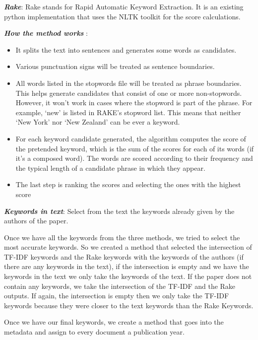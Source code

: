 \documentclass[article,twocolumn]{IEEEtran}
\providecommand{\tightlist}{%
      \setlength{\itemsep}{0pt}\setlength{\parskip}{0pt}}
\begin{document}
    \textbf{\emph{Rake}}: Rake stands for Rapid Automatic Keyword
Extraction. It is an existing python implementation that uses the NLTK
toolkit for the score calculations.

\textbf{\emph{How the method works}} :

\begin{itemize}
\tightlist
\item
  It splits the text into sentences and generates some words as
  candidates.\\
\item
  Various punctuation signs will be treated as sentence boundaries.
\item
  All words listed in the stopwords file will be treated as phrase
  boundaries. This helps generate candidates that consist of one or more
  non-stopwords. However, it won't work in cases where the stopword is
  part of the phrase. For example, `new' is listed in RAKE's stopword
  list. This means that neither `New York' nor `New Zealand' can be ever
  a keyword.
\item
  For each keyword candidate generated, the algorithm computes the score
  of the pretended keyword, which is the sum of the scores for each of
  its words (if it's a composed word). The words are scored according to
  their frequency and the typical length of a candidate phrase in which
  they appear.
\item
  The last step is ranking the scores and selecting the ones with the
  highest score
\end{itemize}

    \textbf{\emph{Keywords in text}}: Select from the text the keywords
already given by the authors of the paper.

Once we have all the keywords from the three methods, we tried to select
the most accurate keywords. So we created a method that selected the
intersection of TF-IDF keywords and the Rake keywords with the keywords
of the authors (if there are any keywords in the text), if the
intersection is empty and we have the keywords in the text we only take
the keywords of the text. If the paper does not contain any keywords, we
take the intersection of the TF-IDF and the Rake outputs. If again, the
intersection is empty then we only take the TF-IDF keywords because they
were closer to the text keywords than the Rake Keywords.

Once we have our final keywords, we create a method that goes into the
metadata and assign to every document a publication year.
\end{document}
